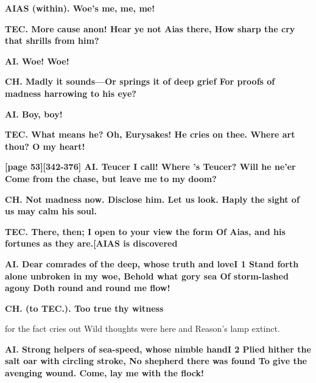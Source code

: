 \documentclass[11pt,letter]{book}
\begin{document}
\par \textbf{AIAS (within). Woe’s me, me, me!}
\par 

\par \textbf{TEC. More cause anon! Hear ye not Aias there, How sharp the cry that shrills from him?}
\par 

\par \textbf{AI. Woe! Woe!}
\par 

\par \textbf{CH. Madly it sounds—Or springs it of deep grief For proofs of madness harrowing to his eye?}
\par 

\par \textbf{AI. Boy, boy!}
\par 

\par \textbf{TEC. What means he? Oh, Eurysakes! He cries on thee. Where art thou? O my heart!}
\par 

\par \textbf{[page 53][342-376] AI. Teucer I call! Where ’s Teucer? Will he ne’er Come from the chase, but leave me to my doom?}
\par 

\par \textbf{CH. Not madness now. Disclose him. Let us look. Haply the sight of us may calm his soul.}
\par 

\par \textbf{TEC. There, then; I open to your view the form Of Aias, and his fortunes as they are.[AIAS is discovered}
\par 

\par \textbf{AI. Dear comrades of the deep, whose truth and loveI 1 Stand forth alone unbroken in my woe, Behold what gory sea Of storm-lashed agony Doth round and round me flow!}
\par 

\par \textbf{CH. (to TEC.). Too true thy witness}
\par   for the fact cries out Wild thoughts were here and Reason’s lamp extinct.

\par \textbf{AI. Strong helpers of sea-speed, whose nimble handI 2 Plied hither the salt oar with circling stroke, No shepherd there was found To give the avenging wound. Come, lay me with the flock!}
\par 
\end{document}
